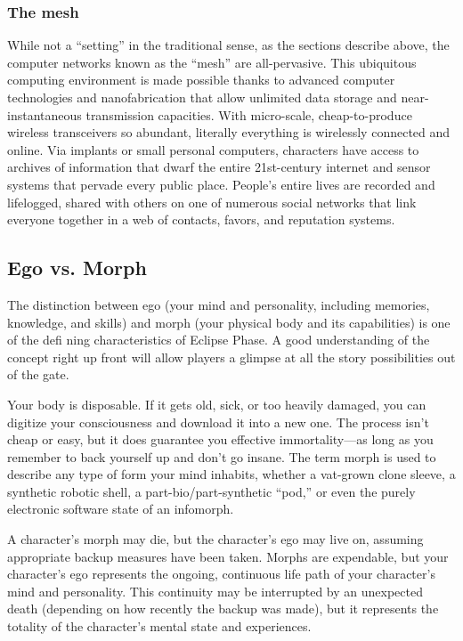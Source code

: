 \subsubsection{The mesh} \label{sec:mesh} 

While not a ``setting'' in the traditional sense, as the sections describe above, the computer networks known as the ``mesh'' are all-pervasive. This ubiquitous computing environment is made possible thanks to advanced computer technologies and nanofabrication that allow unlimited data storage and near-instantaneous transmission capacities. With micro-scale, cheap-to-produce wireless transceivers so abundant, literally everything is wirelessly connected and online. Via implants or small personal computers, characters have access to archives of information that dwarf the entire 21st-century internet and sensor systems that pervade every public place. People's entire lives are recorded and lifelogged, shared with others on one of numerous social networks that link everyone together in a web of contacts, favors, and reputation systems. 



\subsection{Ego vs. Morph} \label{sec:ego-vs.-morph} 

The distinction between ego (your mind and personality, including memories, knowledge, and skills) and morph (your physical body and its capabilities) is one of the defi ning characteristics of Eclipse Phase. A good understanding of the concept right up front will allow players a glimpse at all the story possibilities out of the gate. 

Your body is disposable. If it gets old, sick, or too heavily damaged, you can digitize your consciousness and download it into a new one. The process isn't cheap or easy, but it does guarantee you effective immortality—as long as you remember to back yourself up and don't go insane. The term morph is used to describe any type of form your mind inhabits, whether a vat-grown clone sleeve, a synthetic robotic shell, a part-bio/part-synthetic ``pod,'' or even the purely electronic software state of an infomorph. 

A character's morph may die, but the character's ego may live on, assuming appropriate backup measures have been taken. Morphs are expendable, but your character's ego represents the ongoing, continuous life path of your character's mind and personality. This continuity may be interrupted by an unexpected death (depending on how recently the backup was made), but it represents the totality of the character's mental state and experiences. 

